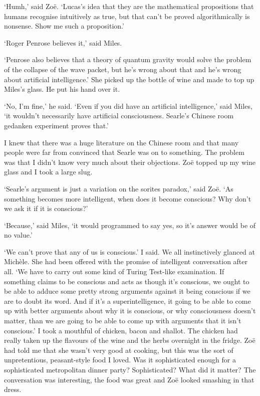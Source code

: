 `Humh,' said Zoë. `Lucas's idea that they are the mathematical
propositions that humans recognise intuitively as true, but that
can't be proved algorithmically is nonsense. Show me such a
proposition.'

`Roger Penrose believes it,' said Miles.

`Penrose also believes that a theory of quantum gravity would solve
the problem of the collapse of the wave packet, but he's wrong about
that and he's wrong about artificial intelligence.' She picked up
the bottle of wine and made to top up Miles's glass. He put his hand
over it.

`No, I'm fine,' he said. `Even if you did have an artificial
intelligence,' said Miles, `it wouldn't necessarily have artificial
consciousness. Searle's Chinese room gedanken experiment proves
that.'

I knew that there was a huge literature on the Chinese room and that
many people were far from convinced that Searle was on to something.
The problem was that I didn't know very much about their objections.
Zoë topped up my wine glass and I took a large slug.

`Searle's argument is just a variation on the sorites paradox,' said
Zoë. `As something becomes more intelligent, when does it become
conscious? Why don't we ask it if it is conscious?'

`Because,' said Miles, `it would programmed to say yes, so it's
answer would be of no value.'

`We can't prove that any of us is conscious.' I said. We all
instinctively glanced at Michèle. She had been offered with the
promise of intelligent conversation after all. `We have to carry out
some kind of Turing Test-like examination. If something claims to be
conscious and acts as though it's conscious, we ought to be able to
adduce some pretty strong arguments against it being conscious if we
are to doubt its word. And if it's a superintelligence, it going to
be able to come up with better arguments about why it is conscious,
or why consciousness doesn't matter, than we are going to be able to
come up with arguments that it isn't conscious.' I took a mouthful
of chicken, bacon and shallot. The chicken had really taken up the
flavours of the wine and the herbs overnight in the fridge. Zoë
had told me that she wasn't very good at cooking, but this was the
sort of unpretentious, peasant-style food I loved. Was it sophisticated
enough for a sophisticated metropolitan dinner party? Sophisticated?
What did it matter? The conversation was {\twelveit interesting},
the food was great and Zoë looked smashing in that dress.

